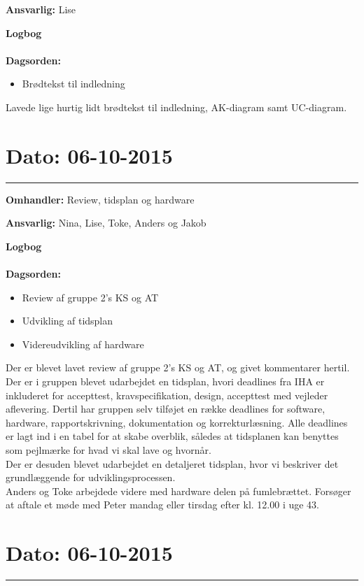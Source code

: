 \textbf{Ansvarlig:} Lise 

\textbf{Logbog}
\\
\\
\textbf{Dagsorden:}
\begin{itemize}
	\item Brødtekst til indledning
\end{itemize}

Lavede lige hurtig lidt brødtekst til indledning, AK-diagram samt UC-diagram. 




\section{Dato: 06-10-2015 }
\hrule

\textbf{Omhandler:} Review, tidsplan og hardware  

\textbf{Ansvarlig:} Nina, Lise, Toke, Anders og Jakob

\textbf{Logbog}
\\
\\
\textbf{Dagsorden:}
\begin{itemize}
	\item Review af gruppe 2's KS og AT
	\item Udvikling af tidsplan
	\item Videreudvikling af hardware
\end{itemize}

Der er blevet lavet review af gruppe 2's KS og AT, og givet kommentarer hertil. \\
Der er i gruppen blevet udarbejdet en tidsplan, hvori deadlines fra IHA er inkluderet for accepttest, kravspecifikation, design, accepttest med vejleder aflevering. Dertil har gruppen selv tilføjet en række deadlines for software, hardware, rapportskrivning, dokumentation og korrekturlæsning. Alle deadlines er lagt ind i en tabel for at skabe overblik, således at tidsplanen kan benyttes som pejlmærke for hvad vi skal lave og hvornår.\\
Der er desuden blevet udarbejdet en detaljeret tidsplan, hvor vi beskriver det grundlæggende for udviklingsprocessen.\\
Anders og Toke arbejdede videre med hardware delen på fumlebrættet.
Forsøger at aftale et møde med Peter mandag eller tirsdag efter kl. 12.00 i uge 43.

	
	
	
\section{Dato: 06-10-2015 }
\hrule

